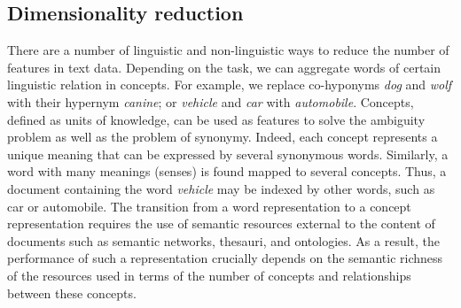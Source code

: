 










\subsection{Dimensionality reduction}

There are a number of linguistic and non-linguistic ways to reduce the number of features in text data. Depending on the task, we can aggregate words of certain linguistic relation in concepts. For example, we replace co-hyponyms \emph{dog} and \emph{wolf} with their hypernym \emph{canine}; or \emph{vehicle} and \emph{car} with \emph{automobile}. Concepts, defined as units of knowledge, can be used as features to solve the ambiguity problem as well as the problem of synonymy. Indeed, each concept represents a unique meaning that can be expressed by several synonymous words. Similarly, a word with many meanings (senses) is found mapped to several concepts. Thus, a document containing the word \emph{vehicle} may be indexed by other words, such as car or automobile. The transition from a word representation to a concept representation requires the use of semantic resources external to the content of documents such as semantic networks, thesauri, and ontologies. As a result, the performance of such a representation crucially depends on the semantic richness of the resources used in terms of the number of concepts and relationships between these concepts. 

